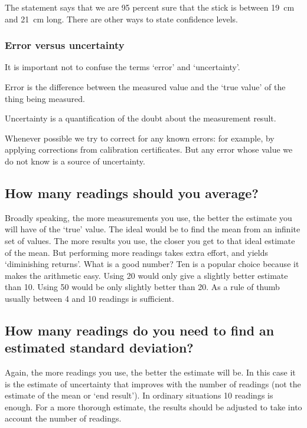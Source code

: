 The statement says that we are 95 percent sure that the stick is between \SI{19}{cm} and \SI{21}{cm} long. There are other ways to state confidence levels.


\subsubsection{Error versus uncertainty}
It is important not to confuse the terms `error' and `uncertainty'.

Error is the difference between the measured value and the `true value' of the thing being measured.

Uncertainty is a quantification of the doubt about the measurement result.

Whenever possible we try to correct for any known errors: for example, by applying corrections from calibration certificates. But any error whose value we do not know is a source of uncertainty.


\subsection{How many readings should you average?}
Broadly speaking, the more measurements you use, the better the estimate you will have of the `true' value. The ideal would be to find the mean from an infinite set of values. The more results you use, the closer you get to that ideal estimate of the mean. But performing more readings takes extra effort, and yields `diminishing returns'. What is a good number? Ten is a popular choice because it makes the arithmetic easy. Using 20 would only give a slightly better estimate than 10. Using 50 would be only slightly better than 20. As a rule of thumb usually between 4 and 10 readings is sufficient.


\subsection{How many readings do you need to find an estimated standard deviation?}
Again, the more readings you use, the better the estimate will be. In this case it is the estimate of uncertainty that improves with the number of readings (not the estimate of the mean or `end result'). In ordinary situations 10 readings is enough. For a more thorough estimate, the results should be adjusted to take into account the number of readings.


